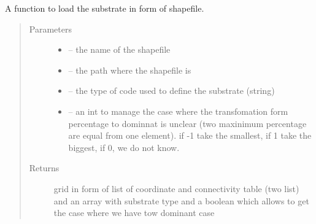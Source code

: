 \documentclass[letterpaper,10pt,english]{sphinxmanual}
\begin{document}

\begin{fulllineitems}
\label{\detokenize{index:src.substrate.load_sub_shp}}
A function to load the substrate in form of shapefile.
\begin{quote}\begin{description}
\item[{Parameters}] \leavevmode\begin{itemize}
\item {} 
 -- the name of the shapefile

\item {} 
 -- the path where the shapefile is

\item {} 
 -- the type of code used to define the substrate (string)

\item {} 
 -- an int to manage the case where the transfomation form percentage to dominnat is unclear (two
maxinimum percentage are equal from one element). if -1 take the smallest, if 1 take the biggest,
if 0, we do not know.

\end{itemize}

\item[{Returns}] \leavevmode
grid in form of list of coordinate and connectivity table (two list)
and an array with substrate type and a boolean which allows to get the case where we have tow dominant case

\end{description}\end{quote}

\end{fulllineitems}

\end{document}
